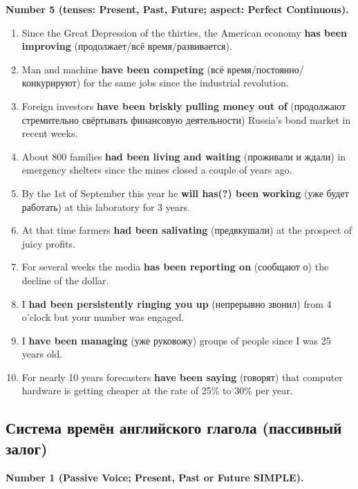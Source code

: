 \documentclass[main.tex]{subfiles}
\begin{document}
\textbf{Number 5 (tenses: Present, Past, Future; aspect: Perfect Continuous).}

\begin{enumerate}[nosep]
	\item Since the Great Depression of the thirties, the American economy \textbf{has been improving} (продолжает/всё время/развивается).
	\item Man and machine \textbf{have been competing} (всё время/постоянно/конкурируют) for the same jobs since the industrial revolution.
	\item Foreign investors \textbf{have been briskly pulling money out of} (продолжают стремительно свёртывать финансовую деятельности) Russia's bond market in recent weeks.
	\item About 800 families \textbf{had been living and waiting} (проживали и ждали) in emergency shelters since the mines closed a couple of years ago.
	\item By the 1st of September this year he \textbf{will has(?) been working} (уже будет работать) at this laboratory for 3 years.
	\item At that time farmers \textbf{had been salivating} (предвкушали) at the prospect of juicy profits.
	\item For several weeks the media \textbf{has been reporting on} (сообщают о) the decline of the dollar.
	\item I \textbf{had been persistently ringing you up} (непрерывно звонил) from 4 o'clock but your number was engaged.
	\item I \textbf{have been managing} (уже руковожу) groups of people since I was 25 years old.
	\item For nearly 10 years forecasters \textbf{have been saying} (говорят) that computer hardware is getting cheaper at the rate of 25\% to 30\% per year.
\end{enumerate}

\subsection{Система времён английского глагола (пассивный залог)}

\textbf{Number 1 (Passive Voice; Present, Past or Future SIMPLE).}
\end{document}
